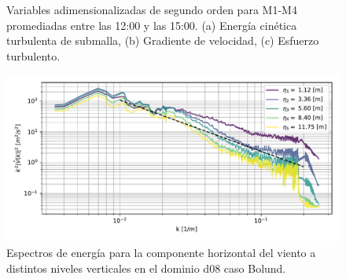 \begin{figure}[H]
\begin{center}
	\end{center}
	\vspace{-5mm}
	\caption{Variables adimensionalizadas de segundo orden para M1-M4 promediadas entre las 12:00 y las 15:00. (a) Energía cinética turbulenta de submalla, (b) Gradiente de velocidad, (c) Esfuerzo turbulento. }
	\label{fig:06_bol_mean_secondorder}
\end{figure}

\begin{figure}[H]
	\centering
	\includegraphics[width=1.0\linewidth,page=1,trim={3mm 5mm 3mm 3mm},clip]{Imagenes/06/bol/spectra}%
	\caption{Espectros de energía para la componente horizontal del viento a distintos niveles verticales en el dominio d08 caso Bolund.}
	\label{fig:06_bol_spectrum}
\end{figure}

